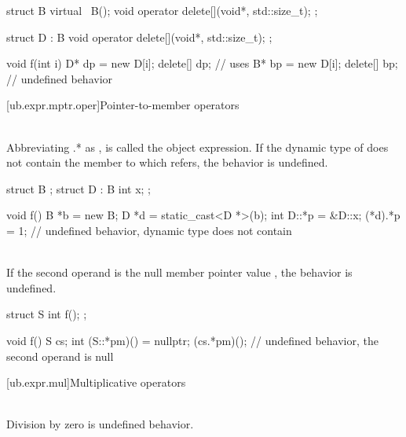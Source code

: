 {\pnum
\begin{example}
\begin{codeblock}
struct B {
  virtual ~B();
  void operator delete[](void*, std::size_t);
};

struct D : B {
  void operator delete[](void*, std::size_t);
};

void f(int i) {
  D* dp = new D[i];
  delete[] dp;          // uses 
  B* bp = new D[i];
  delete[] bp;          // undefined behavior
}
\end{codeblock}
\end{example}


[ub.expr.mptr.oper]{Pointer-to-member operators}

\pnum
{} \\
Abbreviating .* as ,  is called the object expression. If the dynamic type
of  does not contain the member to which  refers, the behavior is undefined.

\pnum
\begin{example}
\begin{codeblock}
struct B {};
struct D : B {
  int x;
};

void f() {
  B *b = new B;
  D *d = static_cast<D *>(b);
  int D::*p = &D::x;
  (*d).*p = 1;          // undefined behavior, dynamic type  does not contain 
}
\end{codeblock}
\end{example}


\pnum
{} \\
If the second operand is the null
member pointer value , the behavior is undefined.

\pnum
\begin{example}
\begin{codeblock}
struct S {
  int f();
};

void f() {
  S cs;
  int (S::*pm)() = nullptr;
  (cs.*pm)();           // undefined behavior, the second operand is null
}
\end{codeblock}
\end{example}


[ub.expr.mul]{Multiplicative operators}

\pnum
{} \\
Division by zero is undefined behavior.

}
